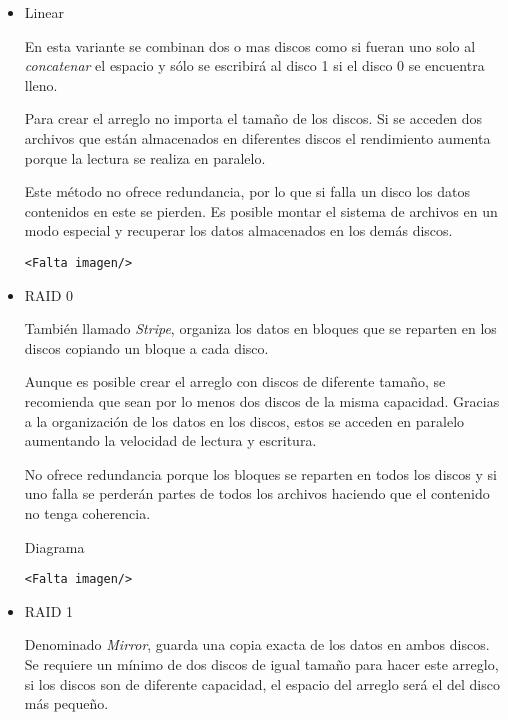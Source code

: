 \begin{itemize}

  \item Linear

En esta variante se combinan dos o mas discos como si fueran uno solo al \emph{concatenar} el espacio y s\'{o}lo se escribir\'{a} al disco 1 si el disco 0 se encuentra lleno.

Para crear el arreglo no importa el tama\~{n}o de los discos. Si se acceden dos archivos que est\'{a}n almacenados en diferentes discos el rendimiento aumenta porque la lectura se realiza en paralelo.

Este m\'{e}todo no ofrece redundancia, por lo que si falla un disco los datos contenidos en este se pierden. Es posible montar el sistema de archivos en un modo especial y recuperar los datos almacenados en los dem\'{a}s discos.

{\large\begin{verbatim}<Falta imagen/>\end{verbatim}}

  \item RAID 0

Tambi\'{e}n llamado \emph{Stripe}, organiza los datos en bloques que se reparten en los discos copiando un bloque a cada disco.

Aunque es posible crear el arreglo con discos de diferente tama\~{n}o, se recomienda que sean por lo menos dos discos de la misma capacidad. Gracias a la organizaci\'{o}n de los datos en los discos, estos se acceden en paralelo aumentando la velocidad de lectura y escritura.

No ofrece redundancia porque los bloques se reparten en todos los discos y si uno falla se perder\'{a}n partes de todos los archivos haciendo que el contenido no tenga coherencia.

Diagrama \cite{18b4e676f432f4780a509b508056c779}
{\large\begin{verbatim}<Falta imagen/>\end{verbatim}}

  \item RAID 1
  
Denominado \emph{Mirror}, guarda una copia exacta de los datos en ambos discos. Se requiere un m\'{i}nimo de dos discos de igual tama\~{n}o para hacer este arreglo, si los discos son de diferente capacidad, el espacio del arreglo ser\'{a} el del disco m\'{a}s peque\~{n}o.


\end{itemize}
